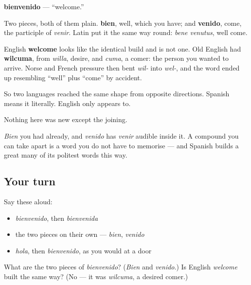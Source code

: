 \begin{cousinweb}
\textbf{bienvenido} — \textquotedblleft{}welcome.\textquotedblright{}

Two pieces, both of them plain. \textbf{bien}, well, which you have; and \textbf{venido}, come, the participle of \emph{venir}. Latin put it the same way round: \emph{bene venutus}, well come.

English \textbf{welcome} looks like the identical build and is not one. Old English had \textbf{wilcuma}, from \emph{willa}, desire, and \emph{cuma}, a comer: the person you wanted to arrive. Norse and French pressure then bent \emph{wil-} into \emph{wel-}, and the word ended up resembling \textquotedblleft{}well\textquotedblright{} plus \textquotedblleft{}come\textquotedblright{} by accident.

So two languages reached the same shape from opposite directions. Spanish means it literally. English only appears to.
\end{cousinweb}

\begin{grammarlens}[title={What you've built}]
Nothing here was new except the joining.

\emph{Bien} you had already, and \emph{venido} has \emph{venir} audible inside it. A compound you can take apart is a word you do not have to memorise — and Spanish builds a great many of its politest words this way.
\end{grammarlens}

\subsection*{Your turn}
Say these aloud:

\begin{itemize}
\raggedright
  \item \emph{bienvenido}, then \emph{bienvenida}
  \item the two pieces on their own — \emph{bien}, \emph{venido}
  \item \emph{hola}, then \emph{bienvenido}, as you would at a door
\end{itemize}

\begin{tcolorbox}[breakable,colback=teal!4,colframe=teal!35!black,title={Before you move on}]
What are the two pieces of \emph{bienvenido}? (\emph{Bien} and \emph{venido}.) Is English \emph{welcome} built the same way? (No — it was \emph{wilcuma}, a desired comer.)
\end{tcolorbox}
